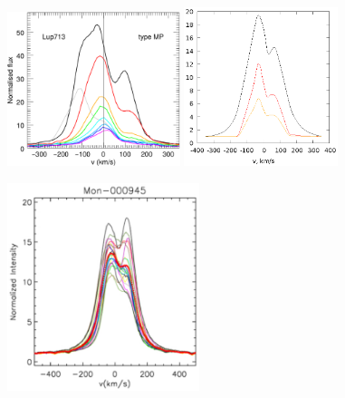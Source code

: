 \documentclass{article}
\begin{document}
\begin{figure}[h]
\centering
\includegraphics[width=0.45\textwidth]{profiles2.eps}
\includegraphics[width=0.4\textwidth]{lookslike45.eps}
\caption{\rm}
\label{fig:compprof}
\end{figure} 

\begin{figure}[h]
\centering
\includegraphics[width=0.5\textwidth]{profilevar.eps}
\caption{\rm}
\label{fig:compvar}
\end{figure} 
\end{document}
